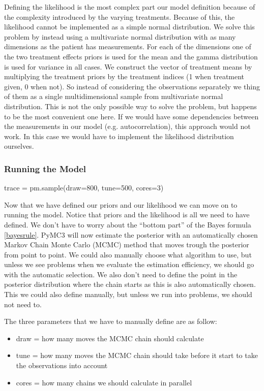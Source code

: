 \documentclass[12pt,a4paper,leqno]{report}
\theoremstyle{plain}
\theoremstyle{definition}
\theoremstyle{remark}
\begin{document}
Defining the likelihood is the most complex part our model definition because of the
complexity introduced by the varying treatments. Because of this, the likelihood cannot
be implemented as a simple normal distribution. We solve this problem by instead using a
multivariate normal distribution with as many dimensions as the patient has
measurements. For each of the dimensions one of the two treatment effects priors is used for the mean
and the gamma distribution is used for variance in all cases. We construct the vector of
treatment means by multiplying the treatment priors by the treatment indices (1 when
treatment given, 0 when not). So instead of considering
the observations separately we thing of them as a single multidimensional sample from
multivariate normal distribution. This is not the only possible way to solve the
problem, but happens to be the most convenient one here. If we would have some
dependencies between the measurements in our model (e.g. autocorrelation), this approach
would not work. In this case we would have to implement the likelihood distribution
ourselves.

\subsubsection{Running the Model}

\bigskip
\begin{pyverbatim}
trace = pm.sample(draw=800, tune=500, cores=3)
\end{pyverbatim}
\bigskip

Now that we have defined our priors and our likelihood we can move on to running the
model. Notice that priors and the likelihood is all we need to have defined. We don't
have to worry about the ``bottom part'' of the Bayes formula \ref{bayesrule}. PyMC3 will
now estimate the posterior with an automatically chosen Markov Chain Monte Carlo (MCMC) method
that moves trough the posterior from point to point. We could also manually choose what
algorithm to use, but unless we see problems when we evaluate the estimation efficiency,
we should go with the automatic selection. We also don't need to define the point in the
posterior distribution where the chain starts as this is also automatically chosen. This
we could also define manually, but unless we run into problems, we should not need to.

The three parameters that we have to manually define are as follow:

\begin{itemize}
    \item draw = how many moves the MCMC chain should calculate
    \item tune = how many moves the MCMC chain should take before it start to
    take the observations into account
    \item cores = how many chains we should calculate in parallel
\end{itemize}
\end{document}
